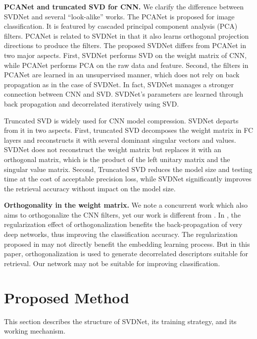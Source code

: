 \documentclass[10pt,twocolumn,letterpaper]{article}
\begin{document}
\textbf{PCANet and truncated SVD for CNN.}
We clarify the difference between SVDNet and several ``look-alike'' works.
The PCANet \cite{DBLP:journals/tip/ChanJGLZM15} is proposed for image classification. It is featured by cascaded principal component analysis (PCA) filters. PCANet is related to SVDNet in that it also learns orthogonal projection directions to produce the filters. The proposed SVDNet  differs from PCANet in two major aspects. First, SVDNet performs SVD on the weight matrix of CNN, while PCANet performs PCA on the raw data and feature. Second, the filters in PCANet are learned in an unsupervised manner, which does not rely on back propagation as in the case of SVDNet. In fact, SVDNet manages a stronger connection between CNN and SVD. SVDNet's parameters are learned through back propagation and decorrelated iteratively using SVD.

Truncated SVD \cite{DBLP:conf/nips/DentonZBLF14,DBLP:conf/interspeech/XueLG13} is widely used for CNN model compression. SVDNet departs from it in two aspects. First, truncated SVD decomposes the weight matrix in FC layers and reconstructs it with several dominant singular vectors and values. SVDNet does not reconstruct the weight matrix but replaces it with an orthogonal matrix, which is the product of the left unitary matrix and the singular value matrix. Second, Truncated SVD reduces the model size and testing time at the cost of acceptable precision loss, while SVDNet significantly improves the retrieval accuracy without impact on the model size.   

\textbf{Orthogonality in the weight matrix.}
We note a concurrent work \cite{DBLP:conf/cvpr/Di17} which also aims to orthogonalize the CNN filters, yet our work is different from \cite{DBLP:conf/cvpr/Di17}. In  \cite{DBLP:conf/cvpr/Di17}, the regularization effect of orthogonalization benefits the back-propagation of very deep networks, thus improving the classification accuracy. The regularization proposed in \cite{DBLP:conf/cvpr/Di17} may not directly benefit the embedding learning process. But in this paper, orthogonalization is used to generate decorrelated descriptors suitable for retrieval. Our network may not be suitable for improving classification. 


\section{Proposed Method}
This section describes the structure of SVDNet, its training strategy, and its working mechanism.
\end{document}
